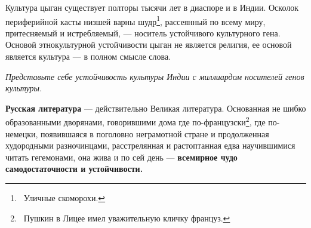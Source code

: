 \documentclass[a4paper]{article}
\begin{document}
{
Культура цыган существует полторы тысячи лет в диаспоре и в Индии. Осколок периферийной касты низшей варны
шудр\footnote{\foreignlanguage{russian}{\ Уличные скоморохи.}}, рассеянный по всему миру, притесняемый и истребляемый,
— носитель устойчивого культурного гена. Основой этнокультурной устойчивости цыган не является религия, ее основой
является культура — в полном смысле слова. }

{\itshape
Представьте себе устойчивость культуры Индии с миллиардом носителей генов культуры.}

{
\textbf{Русская литература} — действительно Великая литература. Основанная не шибко образованными дворянами, говорившими
дома где по-французски\footnote{\foreignlanguage{russian}{\ Пушкин в Лицее имел уважительную кличку
{\textquotedbl}француз{\textquotedbl}.}}, где по-немецки, появившаяся в поголовно неграмотной стране и продолженная
худородными разночинцами, расстрелянная и растоптанная едва научившимися читать гегемонами, она жива и по сей день —
\textbf{всемирное чудо самодостаточности и устойчивости. }}
\end{document}
